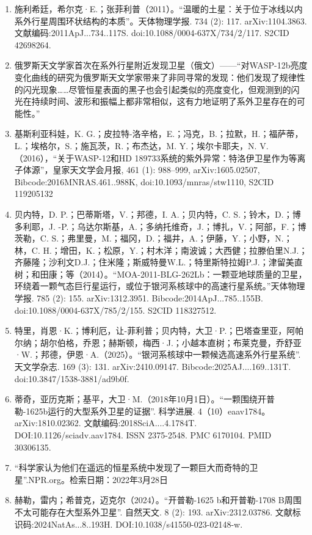 \begin{enumerate}
\item 施利希廷，希尔克·E.；张菲利普（2011）。“温暖的土星：关于位于冰线以内系外行星周围环状结构的本质”。天体物理学报. 734 (2): 117. arXiv:1104.3863. 文献编码:2011ApJ...734..117S. doi:10.1088/0004-637X/734/2/117. S2CID 42698264.
\item 俄罗斯天文学家首次在系外行星附近发现卫星（俄文）——“对WASP-12b亮度变化曲线的研究为俄罗斯天文学家带来了非同寻常的发现：他们发现了规律性的闪光现象……尽管恒星表面的黑子也会引起类似的亮度变化，但观测到的闪光在持续时间、波形和振幅上都非常相似，这有力地证明了系外卫星存在的可能性。”
\item 基斯利亚科娃，K. G.；皮拉特-洛辛格，E.；冯克，B.；拉默，H.；福萨蒂，L.；埃格尔，S.；施瓦茨，R.；布杰达，M. Y.；埃尔卡耶夫，N. V.（2016），“关于WASP-12和HD 189733系统的紫外异常：特洛伊卫星作为等离子体源”，皇家天文学会月报, 461 (1): 988–999, arXiv:1605.02507, Bibcode:2016MNRAS.461..988K, doi:10.1093/mnras/stw1110, S2CID 119205132
\item 贝内特，D. P.；巴蒂斯塔，V.；邦德，I. A.；贝内特，C. S.；铃木，D.；博多利耶，J. -P.；乌达尔斯基，A.；多纳托维奇，J.；博扎，V.；阿部，F.；博茨勒，C. S.；弗里曼，M.；福冈，D.；福井，A.；伊藤，Y.；小野，N.；林，C. H.；增田，K.；松原，Y.；村木洋；南波诚；大西健；拉滕伯里N.J.；齐藤隆；沙利文D.J.；住米隆；斯威特曼W.L.；特里斯特拉姆P.J.；津留美直树；和田康；等（2014）。“MOA-2011-BLG-262Lb：一颗亚地球质量的卫星，环绕着一颗气态巨行星运行，或位于银河系核球中的高速行星系统。”天体物理学报. 785 (2): 155. arXiv:1312.3951. Bibcode:2014ApJ...785..155B. doi:10.1088/0004-637X/785/2/155. S2CID 118327512.
\item 特里，肖恩·K.；博利厄，让-菲利普；贝内特，大卫·P.；巴塔查里亚，阿帕尔纳；胡尔伯格，乔恩；赫斯顿，梅西·J.；小越本直树；布莱克曼，乔舒亚·W.；邦德，伊恩·A.（2025）。“银河系核球中一颗候选高速系外行星系统”. 天文学杂志. 169 (3): 131. arXiv:2410.09147. Bibcode:2025AJ....169..131T. doi:10.3847/1538-3881/ad9b0f.
\item 蒂奇，亚历克斯；基平，大卫·M.（2018年10月1日）。“一颗围绕开普勒-1625b运行的大型系外卫星的证据”. 科学进展. 4（10）eaav1784。arXiv:1810.02362. 文献编码:2018SciA....4.1784T. DOI:10.1126/sciadv.aav1784. ISSN 2375-2548. PMC 6170104. PMID 30306135.
\item “科学家认为他们在遥远的恒星系统中发现了一颗巨大而奇特的卫星”.NPR.org。检索日期：2022年3月28日
\item 赫勒，雷内；希普克，迈克尔（2024）。“开普勒-1625 b和开普勒-1708 B周围不太可能存在大型系外卫星”. 自然天文. 8 (2): 193. arXiv:2312.03786. 文献标识码:2024NatAs...8..193H. DOI:10.1038/s41550-023-02148-w.

\end{enumerate}
